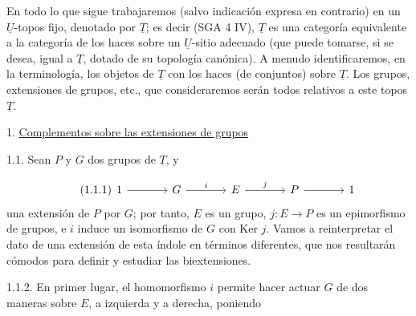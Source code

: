 En todo lo que sigue trabajaremos (salvo indicación expresa en
contrario) en un $\underline{U}$-topos fijo, denotado por
$\underline{T}$; es decir (SGA 4 IV), $\underline{T}$ es una categoría
equivalente a la categoría de los haces sobre un $\underline{U}$-sitio
adecuado (que puede tomarse, si se desea, igual a $\underline{T}$,
dotado de su topología canónica). A menudo identificaremos, en la
terminología, los objetos de $\underline{T}$ con los haces (de
conjuntos) sobre $\underline{T}$. Los grupos, extensiones de grupos,
etc., que consideraremos serán todos relativos a este topos
$\underline{T}$.


1. \underline{Complementos sobre las extensiones de grupos}

1.1.   Sean $P$ y $G$ dos grupos de $\underline{T}$, y

\begin{equation}\tag{1.1.1}
\begin{tikzcd}[column sep=large]
1 \arrow[r] & G \arrow[r, "i"] & E \arrow[r, "j"] & P \arrow[r] & 1
\end{tikzcd}
\end{equation}
una extensión de $P$ por $G$; por tanto, $E$ es un grupo,
$j : E \longrightarrow P$ es un epimorfismo de grupos, e $i$ induce
un isomorfismo de $G$ con Ker $j$. Vamos a reinterpretar el dato de una
extensión de esta índole en términos diferentes, que nos resultarán
cómodos para definir y estudiar las biextensiones.



1.1.2.  En primer lugar, el homomorfismo $i$ permite hacer actuar $G$
de dos maneras sobre $E$, a izquierda y a derecha, poniendo

